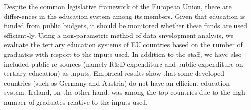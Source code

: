 
\begin{Abstrakt}
    Despite the common legislative framework of the European Union, there are differ-ences in the education system among its members. Given that education is funded from public budgets, it should be monitored whether these funds are used efficient-ly. Using a non-parametric method of data envelopment analysis, we evaluate the tertiary education systems of EU countries based on the number of graduates with respect to the inputs used. In addition to the staff, we have also included public re-sources (namely R\&D expenditure and public expenditure on tertiary education) as inputs. Empirical results show that some developed countries (such as Germany and Austria) do not have an efficient education system. Ireland, on the other hand, was among the top countries due to the high number of graduates relative to the inputs used.
\end{Abstrakt}



\clearpage